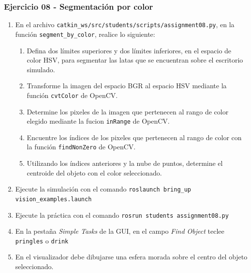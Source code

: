 \begin{frame}\frametitle{Ejercicio 08 - Segmentación por color}
  \begin{enumerate}
  \item En el archivo \texttt{catkin\_ws/src/students/scripts/assignment08.py}, en la función \texttt{segment\_by\_color}, realice lo siguiente:
    \begin{enumerate}
    \item Defina dos límites superiores y dos límites inferiores, en el espacio de color HSV, para segmentar las latas que se encuentran sobre el escritorio simulado.
    \item Transforme la imagen del espacio BGR al espacio HSV mediante la función \texttt{cvtColor} de OpenCV.
    \item Determine los pixeles de la imagen que pertenecen al rango de color elegido mediante la fucion \texttt{inRange} de OpenCV.
    \item Encuentre los índices de los pixeles que pertenecen al rango de color con la función \texttt{findNonZero} de OpenCV.
    \item Utilizando los índices anteriores y la nube de puntos, determine el centroide del objeto con el color seleccionado. 
    \end{enumerate}
  \item Ejecute la simulación con el comando \texttt{roslaunch bring\_up vision\_examples.launch }
  \item Ejecute la práctica con el comando \texttt{rosrun students assignment08.py}
  \item En la pestaña \textit{Simple Tasks} de la GUI, en el campo \textit{Find Object} teclee \texttt{pringles} o \texttt{drink}
  \item En el visualizador debe dibujarse una esfera morada sobre el centro del objeto seleccionado. 
  \end{enumerate}
\end{frame}


